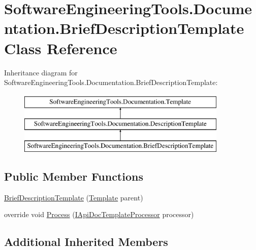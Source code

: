 \hypertarget{class_software_engineering_tools_1_1_documentation_1_1_brief_description_template}{\section{Software\+Engineering\+Tools.\+Documentation.\+Brief\+Description\+Template Class Reference}
\label{class_software_engineering_tools_1_1_documentation_1_1_brief_description_template}
}
Inheritance diagram for Software\+Engineering\+Tools.\+Documentation.\+Brief\+Description\+Template\+:\begin{figure}[H]
\begin{center}
\leavevmode
\includegraphics[height=3.000000cm]{class_software_engineering_tools_1_1_documentation_1_1_brief_description_template}
\end{center}
\end{figure}
\subsection*{Public Member Functions}
\begin{DoxyCompactItemize}
\item 
\hyperlink{class_software_engineering_tools_1_1_documentation_1_1_brief_description_template_a692c38875f55af387e592f5e6181d3ed}{Brief\+Description\+Template} (\hyperlink{class_software_engineering_tools_1_1_documentation_1_1_template}{Template} parent)
\item 
override void \hyperlink{class_software_engineering_tools_1_1_documentation_1_1_brief_description_template_a8e800971557ae734f89ac200352402ab}{Process} (\hyperlink{interface_software_engineering_tools_1_1_documentation_1_1_i_api_doc_template_processor}{I\+Api\+Doc\+Template\+Processor} processor)
\end{DoxyCompactItemize}
\subsection*{Additional Inherited Members}


